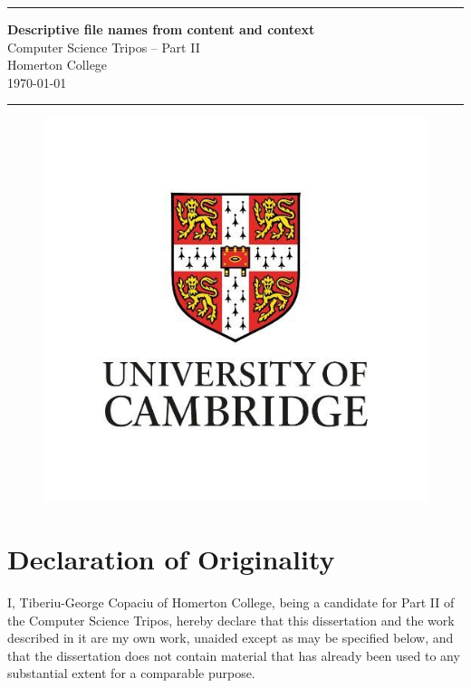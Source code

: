 \documentclass[12pt,a4paper,oneside]{report}
\newcommand{\HRulee}{\rule{\linewidth}{0.5mm}}
\begin{document}




\pagestyle{empty}


\vspace*{60mm}
\HRulee
\begin{center}

  \Huge
  \textbf{Descriptive file names from content and context} \\[5mm]
  Computer Science Tripos -- Part II \\[5mm]
  Homerton College \\[5mm]
  \today  %
\end{center}
\HRulee
\begin{figure}[H]
  \centering
  \includegraphics[scale = 0.5]{Images/logo2.jpg}
\end{figure}


\pagestyle{plain}
\newpage
\vspace*{35mm}

\section*{Declaration of Originality}
I, Tiberiu-George Copaciu of Homerton College,
being a candidate for Part II of the Computer Science Tripos,
hereby declare that this dissertation and the work described in it
are my own work, unaided except as may be specified below, and
that the dissertation does not contain material that has already
been used to any substantial extent for a comparable purpose. \\
\end{document}
